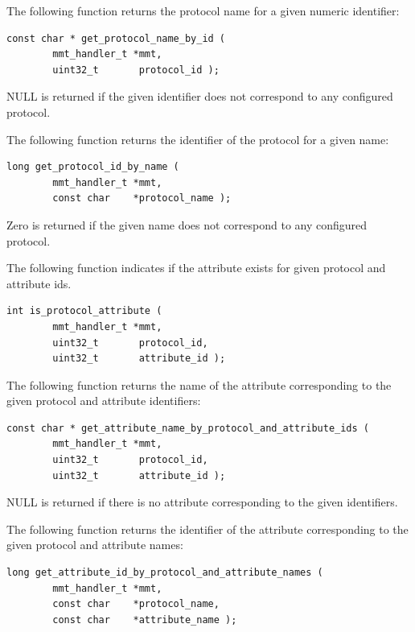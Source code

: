 The following function returns the protocol name for a given numeric identifier:

\begin{lstlisting}[style=Cpp]
const char * get_protocol_name_by_id (
        mmt_handler_t *mmt,
        uint32_t       protocol_id );
\end{lstlisting}

NULL is returned if the given identifier does not correspond to any configured protocol. 


The following function returns the identifier of the protocol for a given name:

\begin{lstlisting}[style=Cpp]
long get_protocol_id_by_name (
        mmt_handler_t *mmt,
        const char    *protocol_name );
\end{lstlisting}

Zero is returned if the given name does not correspond to any configured protocol. 


The following function indicates if the attribute exists for given protocol and attribute ids.


\begin{lstlisting}[style=Cpp]
int is_protocol_attribute (
        mmt_handler_t *mmt,
        uint32_t       protocol_id,
        uint32_t       attribute_id );
\end{lstlisting}



The following function returns the name of the attribute corresponding to the given protocol and attribute identifiers:

\begin{lstlisting}[style=Cpp]
const char * get_attribute_name_by_protocol_and_attribute_ids (
        mmt_handler_t *mmt,
        uint32_t       protocol_id,
        uint32_t       attribute_id );
\end{lstlisting}

NULL is returned if there is no attribute corresponding to the given identifiers. 


The following function returns the identifier of the attribute corresponding to the given protocol and attribute names:

\begin{lstlisting}[style=Cpp]
long get_attribute_id_by_protocol_and_attribute_names (
        mmt_handler_t *mmt,
        const char    *protocol_name,
        const char    *attribute_name );
\end{lstlisting}


